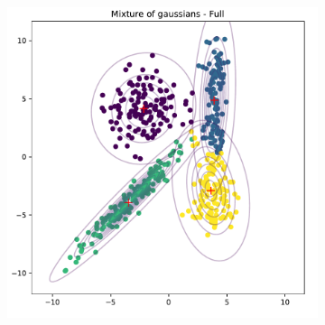 \documentclass[11pt, oneside]{amsart}   	%
\begin{document}
\begin{figure}[t!]
\begin{subfigure}{.49\textwidth}
\end{subfigure}
\\[+5pt]
\begin{subfigure}{.49\textwidth}
  \centering
  \includegraphics[width=\linewidth]{Full.pdf}

\end{subfigure} 

\end{figure}
 
 
\end{document}

